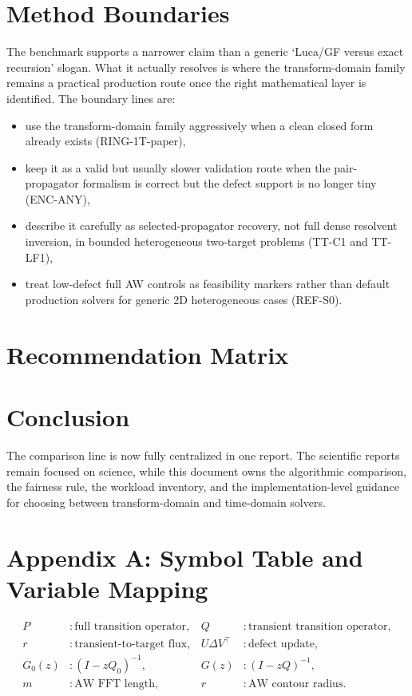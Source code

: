 \documentclass[11pt]{article}
\newcommand{\TabDir}{../artifacts/tables}
\begin{document}
\section{Method Boundaries}
The benchmark supports a narrower claim than a generic `Luca/GF versus exact recursion' slogan. What it actually resolves is where the transform-domain family remains a practical production route once the right mathematical layer is identified. The boundary lines are:
\begin{itemize}[leftmargin=1.4em]
\item use the transform-domain family aggressively when a clean closed form already exists (RING-1T-paper),
\item keep it as a valid but usually slower validation route when the pair-propagator formalism is correct but the defect support is no longer tiny (ENC-ANY),
\item describe it carefully as selected-propagator recovery, not full dense resolvent inversion, in bounded heterogeneous two-target problems (TT-C1 and TT-LF1),
\item treat low-defect full AW controls as feasibility markers rather than default production solvers for generic 2D heterogeneous cases (REF-S0).
\end{itemize}
\section{Recommendation Matrix}
\begin{table}[H]
\centering\small
\resizebox{\linewidth}{!}{%

}
\caption{Decision matrix derived from the six-workload benchmark.}
\end{table}
\section{Conclusion}
The comparison line is now fully centralized in one report. The scientific reports remain focused on science, while this document owns the algorithmic comparison, the fairness rule, the workload inventory, and the implementation-level guidance for choosing between transform-domain and time-domain solvers.
\clearpage
\appendix
\section{Appendix A: Symbol Table and Variable Mapping}
\begin{align}
P &: \text{full transition operator}, & Q &: \text{transient transition operator},\\
r &: \text{transient-to-target flux}, & U\Delta V^{\top} &: \text{defect update},\\
G_0(z) &: (I-zQ_0)^{-1}, & G(z) &: (I-zQ)^{-1},\\
m &: \text{AW FFT length}, & r &: \text{AW contour radius}.
\end{align}
\end{document}
